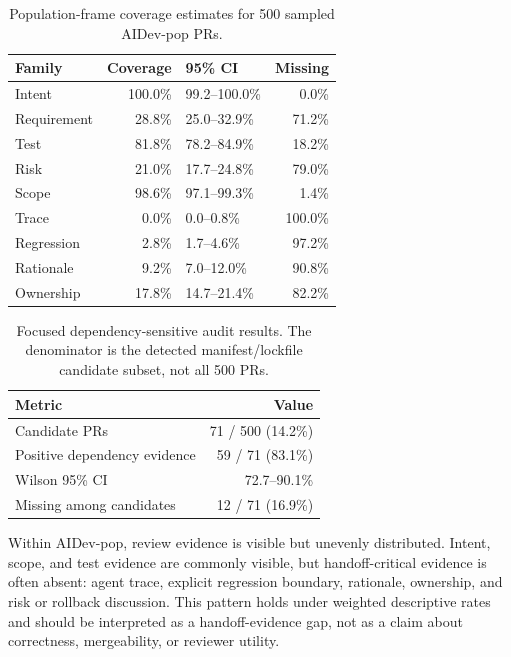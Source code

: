\documentclass[10pt,conference]{IEEEtran}
\begin{document}
\begin{table}[t]
\centering
\caption{Population-frame coverage estimates for 500 sampled AIDev-pop PRs.}
\label{tab:population-evidence-estimates}
\footnotesize
\begin{tabular}{@{}L{0.31\columnwidth}rL{0.22\columnwidth}r@{}}
\toprule
Family & Coverage & 95\% CI & Missing \\
\midrule
Intent & 100.0\% & 99.2--100.0\% & 0.0\% \\
Requirement & 28.8\% & 25.0--32.9\% & 71.2\% \\
Test & 81.8\% & 78.2--84.9\% & 18.2\% \\
Risk & 21.0\% & 17.7--24.8\% & 79.0\% \\
Scope & 98.6\% & 97.1--99.3\% & 1.4\% \\
Trace & 0.0\% & 0.0--0.8\% & 100.0\% \\
Regression & 2.8\% & 1.7--4.6\% & 97.2\% \\
Rationale & 9.2\% & 7.0--12.0\% & 90.8\% \\
Ownership & 17.8\% & 14.7--21.4\% & 82.2\% \\
\bottomrule
\end{tabular}
\end{table}

\begin{table}[t]
\centering
\caption{Focused dependency-sensitive audit results. The denominator is the detected manifest/lockfile candidate subset, not all 500 PRs.}
\label{tab:dependency-sensitive-audit}
\footnotesize
\begin{tabular}{@{}L{0.56\columnwidth}r@{}}
\toprule
Metric & Value \\
\midrule
Candidate PRs & 71 / 500 (14.2\%) \\
Positive dependency evidence & 59 / 71 (83.1\%) \\
Wilson 95\% CI & 72.7--90.1\% \\
Missing among candidates & 12 / 71 (16.9\%) \\
\bottomrule
\end{tabular}
\end{table}

Within AIDev-pop, review evidence is visible but unevenly distributed.
Intent, scope, and test evidence are commonly visible, but handoff-critical evidence is often absent: agent trace, explicit regression boundary, rationale, ownership, and risk or rollback discussion.
This pattern holds under weighted descriptive rates and should be interpreted as a handoff-evidence gap, not as a claim about correctness, mergeability, or reviewer utility.
\end{document}
